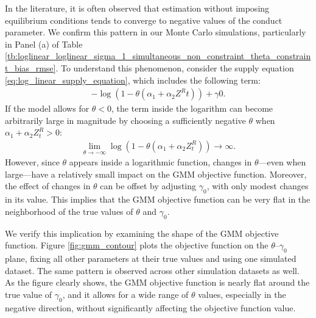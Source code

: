 \documentclass[11pt, a4paper]{article}
\theoremstyle{remark}
\begin{document}
In the literature, it is often observed that estimation without imposing equilibrium conditions tends to converge to negative values of the conduct parameter.
We confirm this pattern in our Monte Carlo simulations, particularly in Panel (a) of Table \ref{tb:loglinear_loglinear_sigma_1_simultaneous_non_constraint_theta_constraint_bias_rmse}.
To understand this phenomenon, consider the supply equation \eqref{eq:log_linear_supply_equation}, which includes the following term:
\begin{align}
-\log(1 - \theta (\alpha_1 + \alpha_2 Z^{R}{t})) + \gamma{0}.
\end{align}
If the model allows for $\theta < 0$, the term inside the logarithm can become arbitrarily large in magnitude by choosing a sufficiently negative $\theta$ when $\alpha_1 + \alpha_2 Z^{R}_{t} > 0$:
\begin{align}
\lim_{\theta \rightarrow -\infty} \log(1 - \theta (\alpha_1 + \alpha_2 Z^{R}_{t})) \rightarrow \infty.
\end{align}
However, since $\theta$ appears inside a logarithmic function, changes in $\theta$—even when large—have a relatively small impact on the GMM objective function. Moreover, the effect of changes in $\theta$ can be offset by adjusting $\gamma_0$, with only modest changes in its value.
This implies that the GMM objective function can be very flat in the neighborhood of the true values of $\theta$ and $\gamma_0$.

We verify this implication by examining the shape of the GMM objective function.
Figure \ref{fig:gmm_contour} plots the objective function on the $\theta$–$\gamma_0$ plane, fixing all other parameters at their true values and using one simulated dataset.
The same pattern is observed across other simulation datasets as well.
As the figure clearly shows, the GMM objective function is nearly flat around the true value of $\gamma_0$, and it allows for a wide range of $\theta$ values, especially in the negative direction, without significantly affecting the objective function value.
\end{document}
